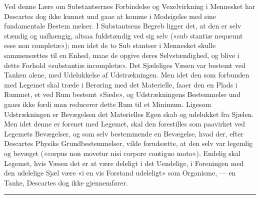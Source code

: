\documentclass[12pt,a4paper]{book}
\newcommand{\divrule}{\begin{center}\rule{2cm}{0.4pt}\end{center}}
\begin{document}
Ved denne Lære om Substantsernes Forbindelse og
Vexelvirkning i Mennesket har Descartes dog ikke kunnet und\-%
gaae at komme i Modsigelse med sine fundamentale Bestem\-%
melser. I Substantsens Begreb ligger det, at den er selv\-%
stændig og uafhængig, altsaa fuldstændig ved sig selv («sub\-%
stantiæ nequeunt esse non completæ»); men idet de to Sub\-%
stantser i Mennesket skulle sammensættes til en Enhed, maae
de opgive deres Selvstændighed, og blive i dette Forhold
«substantiæ incompletæ». Det Sjæleliges Væsen var bestemt
ved Tanken alene, med Udelukkelse af Udstrækningen. Men
idet den som forbunden med Legemet skal træde i Berøring
med det Materielle, faaer den en Plads i Rummet, et ved
Rum bestemt «Sæde», og Udstrækningens Bestemmelse und\-%
gaaes ikke fordi man reducerer dette Rum til et Minimum.
Ligesom Udstrækningen er Bevægelsen det Materielles Egen\-%
skab og udelukket fra Sjælen. Men idet denne er forenet
med Legemet, skal den forestilles som paavirket ved Legemets
Bevægelser, og som selv bestemmende en Bevægelse, hvad der,
efter Descartes Physiks Grundbestemmelser, vilde forudsætte,
at den selv var legemlig og bevæget («corpus non movetur
nisi corpore contiguo moto»). Endelig skal Legemet, hvis
Væsen det er at være deleligt i det Uendelige, i Foreningen
med den udelelige Sjæl være «i en vis Forstand udeleligt» som
Organisme, --- en Tanke, Descartes dog ikke gjennemfører.

\divrule
\end{document}
